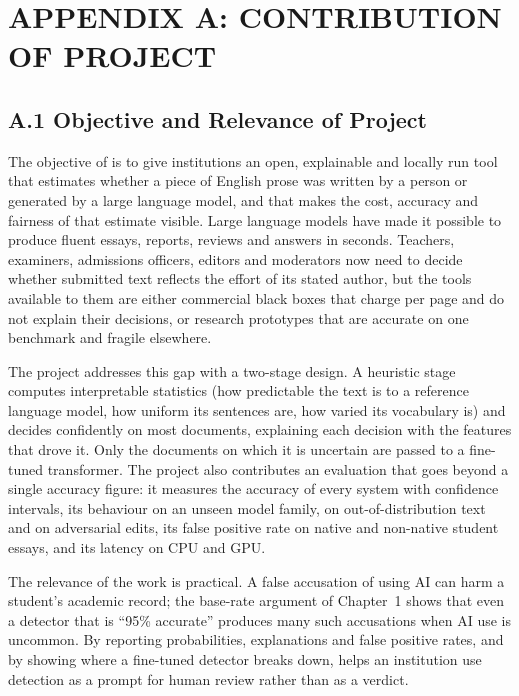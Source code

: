 \clearpage
\setcounter{chapter}{0}
\renewcommand{\thechapter}{\Alph{chapter}}
\chapter*{APPENDIX A: CONTRIBUTION OF PROJECT}
{}

\section*{A.1 Objective and Relevance of Project}

The objective of \veriscript{} is to give institutions an open, explainable and
locally run tool that estimates whether a piece of English prose was written by
a person or generated by a large language model, and that makes the cost,
accuracy and fairness of that estimate visible. Large language models have made
it possible to produce fluent essays, reports, reviews and answers in seconds.
Teachers, examiners, admissions officers, editors and moderators now need to
decide whether submitted text reflects the effort of its stated author, but the
tools available to them are either commercial black boxes that charge per page
and do not explain their decisions, or research prototypes that are accurate on
one benchmark and fragile elsewhere.

The project addresses this gap with a two-stage design. A heuristic stage
computes interpretable statistics (how predictable the text is to a reference
language model, how uniform its sentences are, how varied its vocabulary is)
and decides confidently on most documents, explaining each decision with the
features that drove it. Only the documents on which it is uncertain are passed
to a fine-tuned transformer. The project also contributes an evaluation that
goes beyond a single accuracy figure: it measures the accuracy of every system
with confidence intervals, its behaviour on an unseen model family, on
out-of-distribution text and on adversarial edits, its false positive rate on
native and non-native student essays, and its latency on CPU and GPU.

The relevance of the work is practical. A false accusation of using AI can harm
a student's academic record; the base-rate argument of Chapter~1 shows that even
a detector that is ``95\% accurate'' produces many such accusations when AI use
is uncommon. By reporting probabilities, explanations and false positive rates,
and by showing where a fine-tuned detector breaks down, \veriscript{} helps an
institution use detection as a prompt for human review rather than as a verdict.

